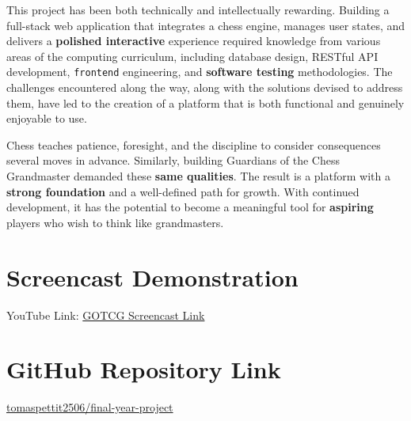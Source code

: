This project has been both technically and intellectually rewarding. Building a full-stack web application that integrates a chess engine, manages user states, and delivers a \textbf{polished interactive} experience required knowledge from various areas of the computing curriculum, including database design, RESTful API development, \texttt{frontend} engineering, and \textbf{software testing} methodologies. The challenges encountered along the way, along with the solutions devised to address them, have led to the creation of a platform that is both functional and genuinely enjoyable to use.

Chess teaches patience, foresight, and the discipline to consider consequences several moves in advance. Similarly, building Guardians of the Chess Grandmaster demanded these \textbf{same qualities}. The result is a platform with a \textbf{strong foundation} and a well-defined path for growth. With continued development, it has the potential to become a meaningful tool for \textbf{aspiring} players who wish to think like grandmasters.


\appendix
\section*{Screencast Demonstration}
YouTube Link: \href{https://youtu.be/7gg2fioyUZk}{GOTCG Screencast Link}

\section*{GitHub Repository Link}
\href{https://github.com/tomaspettit2506/final-year-project}{tomaspettit2506/final-year-project}
